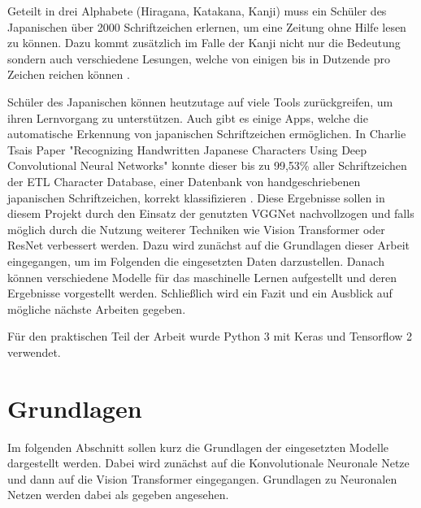\documentclass[twoside,a4paper]{IEEEtran}
\begin{document}
Geteilt in drei Alphabete (Hiragana, Katakana, Kanji) muss ein Schüler des Japanischen über 2000 Schriftzeichen erlernen, um eine Zeitung ohne Hilfe lesen zu können. Dazu kommt zusätzlich im Falle der Kanji nicht nur die Bedeutung sondern auch verschiedene Lesungen, welche von einigen bis in Dutzende pro Zeichen reichen können \cite{ABOUT_JAPANESE}.

Schüler des Japanischen können heutzutage auf viele Tools zurückgreifen, um ihren Lernvorgang zu unterstützen. Auch gibt es einige Apps, welche die automatische Erkennung von japanischen Schriftzeichen ermöglichen. In Charlie Tsais Paper "Recognizing Handwritten Japanese Characters Using Deep Convolutional Neural Networks" konnte dieser bis zu 99,53\% aller Schriftzeichen der ETL Character Database, einer Datenbank von handgeschriebenen japanischen Schriftzeichen, korrekt klassifizieren \cite{RHC}. Diese Ergebnisse sollen in diesem Projekt durch den Einsatz der genutzten VGGNet nachvollzogen und falls möglich durch die Nutzung weiterer Techniken wie Vision Transformer oder ResNet verbessert werden. Dazu wird zunächst auf die Grundlagen dieser Arbeit eingegangen, um im Folgenden die eingesetzten Daten darzustellen. Danach können verschiedene Modelle für das maschinelle Lernen aufgestellt und deren Ergebnisse vorgestellt werden. Schließlich wird ein Fazit und ein Ausblick auf mögliche nächste Arbeiten gegeben.

Für den praktischen Teil der Arbeit wurde Python 3 mit Keras und Tensorflow 2 verwendet.
\section{Grundlagen}
Im folgenden Abschnitt sollen kurz die Grundlagen der eingesetzten Modelle dargestellt werden. Dabei wird zunächst auf die Konvolutionale Neuronale Netze und dann auf die Vision Transformer eingegangen. Grundlagen zu Neuronalen Netzen werden dabei als gegeben angesehen.
\end{document}
